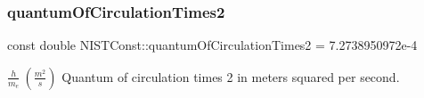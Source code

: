 \subsubsection{\texorpdfstring{quantum\+Of\+Circulation\+Times2}{quantumOfCirculationTimes2}}
{\footnotesize\ttfamily const double N\+I\+S\+T\+Const\+::quantum\+Of\+Circulation\+Times2 = 7.\+2738950972e-\/4}

$\frac{h}{m_e} \ (\frac{m^2}{s})$ Quantum of circulation times 2 in meters squared per second. 